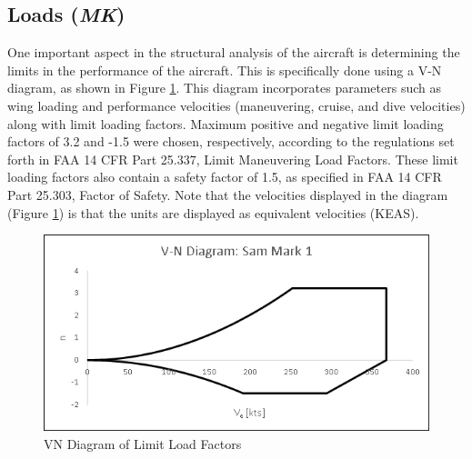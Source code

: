 \subsection{Loads (\textit{MK})}

One important aspect in the structural analysis of the aircraft is determining the limits in the performance of the aircraft. This is specifically done using a V-N diagram, as shown in Figure \ref{figVN}. This diagram incorporates parameters such as wing loading and performance velocities (maneuvering, cruise, and dive velocities) along with limit loading factors. Maximum positive and negative limit loading factors of 3.2 and -1.5 were chosen, respectively, according to the regulations set forth in FAA 14 CFR Part 25.337, Limit Maneuvering Load Factors. These limit loading factors also contain a safety factor of 1.5, as specified in FAA 14 CFR Part 25.303, Factor of Safety. Note that the velocities displayed in the diagram (Figure \ref{figVN}) is that the units are displayed as equivalent velocities (KEAS).

\begin{figure}[H]
    \centering
    \includegraphics[width=\linewidth]{Photos/VN_Diagram_(2-11-20).png}
    \caption{VN Diagram of Limit Load Factors}
    \label{figVN}
\end{figure}




